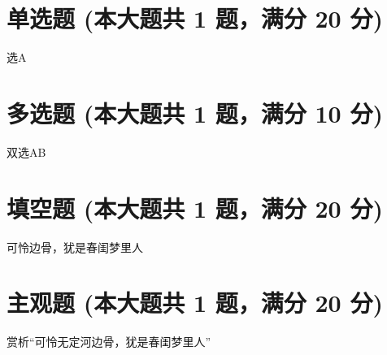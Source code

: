 \documentclass[12pt, a4paper, addpoints]{exam}
\begin{document}
\pagestyle{headandfoot}

\begin{center}
\end{center}
\vspace{5mm}

\normalsize
\vspace{5mm}

\section{\normalsize{单选题 (本大题共 1 题，满分 20 分)}}
\hspace{1.5cm}

\begin{questions}
\question[20] 选A

\begin{oneparchoices}
\end{oneparchoices}

\end{questions}

\hspace{5cm}

\section{\normalsize{多选题 (本大题共 1 题，满分 10 分)}}
\hspace{1.5cm}
\begin{multicols}{2}
\begin{questions}
\question[10] 双选AB

\begin{checkboxes}
\end{checkboxes}

\end{questions}
\end{multicols}

\hspace{5cm}

\section{\normalsize{填空题 (本大题共 1 题，满分 20 分)}}
\hspace{1.5cm}

\begin{questions}
\question[20] 可怜\uline{\qquad\qquad\qquad}边骨，犹是春闺梦里人

\end{questions}

\hspace{5cm}

\section{\normalsize{主观题 (本大题共 1 题，满分 20 分)}}
\hspace{1.5cm}

\begin{questions}
\question[20] 赏析“可怜无定河边骨，犹是春闺梦里人”


\end{questions}
\end{document}
